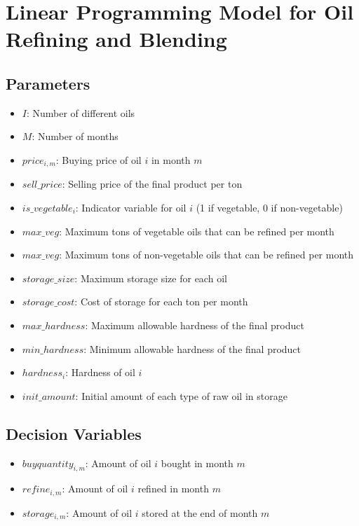 \documentclass{article}
\begin{document}
\section*{Linear Programming Model for Oil Refining and Blending}

\subsection*{Parameters}
\begin{itemize}
    \item $I$: Number of different oils
    \item $M$: Number of months
    \item $price_{i,m}$: Buying price of oil $i$ in month $m$
    \item $sell\_price$: Selling price of the final product per ton
    \item $is\_vegetable_{i}$: Indicator variable for oil $i$ (1 if vegetable, 0 if non-vegetable)
    \item $max\_veg$: Maximum tons of vegetable oils that can be refined per month
    \item $max\_veg$: Maximum tons of non-vegetable oils that can be refined per month
    \item $storage\_size$: Maximum storage size for each oil
    \item $storage\_cost$: Cost of storage for each ton per month
    \item $max\_hardness$: Maximum allowable hardness of the final product
    \item $min\_hardness$: Minimum allowable hardness of the final product
    \item $hardness_{i}$: Hardness of oil $i$
    \item $init\_amount$: Initial amount of each type of raw oil in storage
\end{itemize}

\subsection*{Decision Variables}
\begin{itemize}
    \item $buyquantity_{i,m}$: Amount of oil $i$ bought in month $m$
    \item $refine_{i,m}$: Amount of oil $i$ refined in month $m$
    \item $storage_{i,m}$: Amount of oil $i$ stored at the end of month $m$
\end{itemize}
\end{document}
